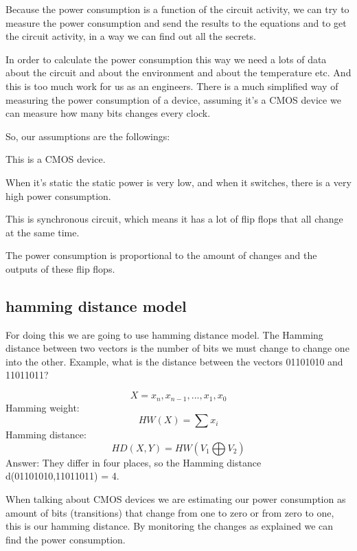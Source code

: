 Because the power consumption is a function of the circuit activity, we can try
to measure the power consumption and send the results to the equations and to
get the circuit activity, in a way we can find out all the secrets.

In order to calculate the power consumption this way we need a lots of data
about the circuit and about the environment and about the temperature etc. And
this is too much work for us as an engineers. There is a much simplified way of
measuring the power consumption of a device, assuming it's a CMOS device we can
measure how many bits changes every clock.

So, our assumptions are the followings:
\begin{inparaenum}
    \item This is a CMOS device.
    \item When it's static the static power is very low, and when it switches,
    there is a very high power consumption.
    \item This is synchronous circuit, which means it has a lot of flip flops
    that all change at the same time.
    \item The power consumption is proportional to the amount of changes and the
    outputs of these flip flops.
\end{inparaenum}


\subsection { hamming distance model }

For doing this we are going to use hamming distance model. The Hamming distance
between two vectors is the number of bits we must change to change one into the
other. Example, what is the distance between the vectors 01101010 and 11011011? 

\begin{displaymath}
    X=x_{n},x_{n-1},...,x_{1},x_{0}
\end{displaymath}
Hamming weight:
\begin{displaymath}
    HW(X)=\sum x_{i}
\end{displaymath}
Hamming distance: 
\begin{displaymath}
    HD(X,Y)=HW(V_{1} \bigoplus V_{2})
\end{displaymath}
Answer: They differ in four places, so the Hamming distance d(01101010,11011011)
= 4.

When talking about CMOS devices we are estimating our power consumption as
amount of bits (transitions) that change from one to zero or from zero to one,
this is our hamming distance. By monitoring the changes as explained we can find
the power consumption.


